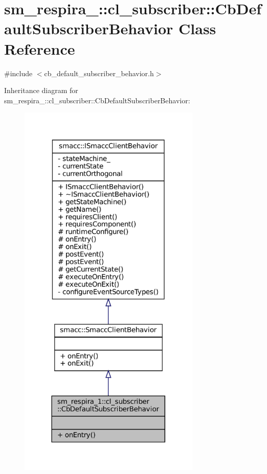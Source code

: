 \hypertarget{classsm__respira__1_1_1cl__subscriber_1_1CbDefaultSubscriberBehavior}{}\section{sm\+\_\+respira\+\_\+:\+:cl\+\_\+subscriber\+:\+:Cb\+Default\+Subscriber\+Behavior Class Reference}
\label{classsm__respira__1_1_1cl__subscriber_1_1CbDefaultSubscriberBehavior}


{\ttfamily \#include $<$cb\+\_\+default\+\_\+subscriber\+\_\+behavior.\+h$>$}



Inheritance diagram for sm\+\_\+respira\+\_\+:\+:cl\+\_\+subscriber\+:\+:Cb\+Default\+Subscriber\+Behavior\+:
\nopagebreak
\begin{figure}[H]
\begin{center}
\leavevmode
\includegraphics[width=246pt]{classsm__respira__1_1_1cl__subscriber_1_1CbDefaultSubscriberBehavior__inherit__graph}
\end{center}
\end{figure}


